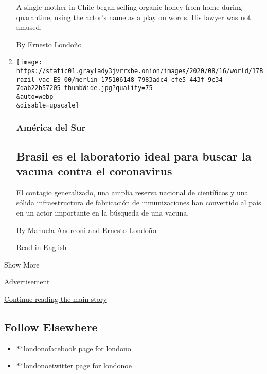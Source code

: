 \begin{enumerate}
  A single mother in Chile began selling organic honey from home during
  quarantine, using the actor's name as a play on words. His lawyer was
  not amused.

  By Ernesto Londoño
\item
  \href{/es/2020/08/17/espanol/america-latina/vacuna-coronavirus-brasil.html}{}

  \texttt{[image: https://static01.graylady3jvrrxbe.onion/images/2020/08/16/world/17Brazil-vac-ES-00/merlin\_175106148\_7983adc4-cfe5-443f-9c34-7dab22b57205-thumbWide.jpg?quality=75\\\&auto=webp\\\&disable=upscale]}

  \hypertarget{amuxe9rica-del-sur}{%
  \subsubsection{América del Sur}\label{amuxe9rica-del-sur}}

  \hypertarget{brasil-es-el-laboratorio-ideal-para-buscar-la-vacuna-contra-el-coronavirus}{%
  \subsection{Brasil es el laboratorio ideal para buscar la vacuna
  contra el
  coronavirus}\label{brasil-es-el-laboratorio-ideal-para-buscar-la-vacuna-contra-el-coronavirus}}

  El contagio generalizado, una amplia reserva nacional de científicos y
  una sólida infraestructura de fabricación de inmunizaciones han
  convertido al país en un actor importante en la búsqueda de una
  vacuna.

  By Manuela Andreoni and Ernesto Londoño

  \href{https://www.nytimes3xbfgragh.onion/2020/08/15/world/americas/brazil-coronavirus-vaccine.html}{Read
  in English}
\end{enumerate}

Show More

Advertisement

\protect\hyperlink{after-mid2}{Continue reading the main story}

\hypertarget{follow-elsewhere}{%
\subsection{Follow Elsewhere}\label{follow-elsewhere}}

\begin{itemize}
\tightlist
\item
  \href{https://www.facebookcorewwwi.onion/londono}{**londonofacebook
  page for londono}
\item
  \href{https://twitter.com/londonoe}{**londonoetwitter page for
  londonoe}
\end{itemize}

